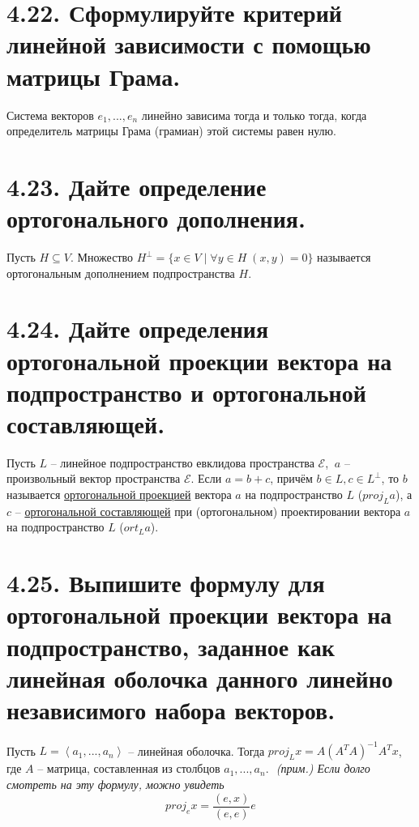 \documentclass{article}
\begin{document}
\section*{\LARGE 4.22. Сформулируйте критерий линейной зависимости с помощью матрицы Грама.}
Система векторов $e_1, ... , e_n$ линейно зависима тогда и только тогда, когда определитель матрицы Грама (грамиан) этой системы равен нулю.

\section*{\LARGE 4.23. Дайте определение ортогонального дополнения.}
Пусть $H \subseteq V$. Множество $H^{\perp} = \{x \in V \;|\;\forall y \in H \; (x, y) = 0\}$ называется ортогональным дополнением подпространства $H$.

\section*{\LARGE 4.24. Дайте определения ортогональной проекции вектора на подпространство и ортогональной составляющей.}
Пусть $L$ -- линейное подпространство евклидова пространства $\mathcal{E}$, $\: a$ -- произвольный вектор пространства $\mathcal{E}$. Если $a = b + c$, причём $b \in L, c \in L^\perp$, то $b$ называется \underline{ортогональной проекцией} вектора $a$ на подпространство $L$ ($proj_L a$), а $c$ -- \underline{ортогональной составляющей} при (ортогональном) проектировании вектора $a$ на подпространство $L$ ($ort_L a$). 

\section*{\LARGE 4.25. Выпишите формулу для ортогональной проекции вектора на подпространство, заданное как линейная оболочка данного линейно независимого набора векторов. }
Пусть $L = \left< a_1, ... , a_n \right>$ -- линейная оболочка. Тогда $proj_L x = A(A^T A)^{-1}A^T x$, где $A$ -- матрица, составленная из столбцов $a_1, ... , a_n$.
\newline $ $
\newline \textit{(прим.) Если долго смотреть на эту формулу, можно увидеть}
$$
proj_e x = \frac{(e, x)}{(e, e)}e
$$
\end{document}

